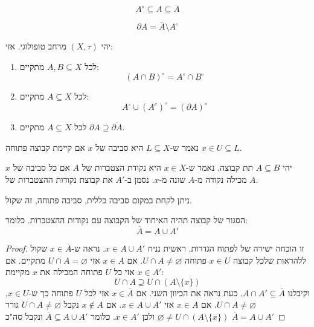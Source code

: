 \documentclass{tstextbook}
\begin{document}
\begin{proposition}
$$A^{\circ }\subseteq A\subseteq \overline{A} $$

\end{proposition}
\begin{definition}
$$\partial A=\overline{A} \setminus  A^{\circ }$$

\end{definition}
\begin{proposition}
יהי \((X,\tau)\) מרחב טופולוגי. אזי:

  \begin{enumerate}
    \item לכל \(A,B \subseteq X\) מתקיים: 
$$(A\cap  B)^{\circ }=A^{\circ }\cap  B^{\circ }$$


    \item לכל \(A\subseteq X\) מתקיים: 
$$A^{\circ }\cup  (A^{c})^{\circ }=(\partial A)^{\circ }$$


    \item לכל \(A\subseteq X\) מתקיים \(\partial A \supseteq \overline{\partial A}\). 


  \end{enumerate}
\end{proposition}
\begin{definition}
נאמר ש-\(L\subseteq X\) היא סביבה של \(x\) אם קיימת קבוצה פתוחה \(x \in U \subseteq L\).

\end{definition}
\begin{definition}
יהי \(A \subseteq B\) תת קבוצה. נאמר ש-\(x \in X\) היא נקודת הצטברות של \(A\) אם כל סביבה של \(x\) מכילה נקודה מ-\(A\) שונה מ-\(x\). נסמן ב-\(A'\) את קבוצת נקודות ההצטברות של \(A\).

\end{definition}
\begin{remark}
ניתן לקחת במקום סביבה כללית, סביבה פתוחה, זה שקול.

\end{remark}
\begin{proposition}
הסגור של קבוצה תהיה האיחוד של הקבוצה עם נקודות ההצטברות. כלומר:
$$\overline{A} =A\cup  A'$$

\end{proposition}
\begin{proof}
זו הוכחה ישירה של לפתוח הגדרות.
ראשית נניח \(x \in A\cup A'\). נראה ש-\(x \in \overline{A}\) שקול ללהראות שלכל קבוצה \(x \in U\) פתוחה \(U\cap A\neq \varnothing\).
אם \(x \in A\) אזי \(U\cap A = \varnothing\) מתקיים.
אם \(x \in A'\) אזי כל \(U\) פתוחה המכילה את \(x\) מקיימת:
$$U\cap  A \supseteq U\cap  (A\setminus  \{ x \})$$
וקיבלנו \(A\cap A'\subseteq \overline{A}\).
כעת נראה את הכיוון השני. אם \(x \in \overline{A}\) אזי לכל \(U\) פתוחה כך ש-\(x \in U\), \(U\cap A \neq \varnothing\).
אם \(x \in A\) אזי \(x \in A\cup A'\).
אם \(x \not\in A\) נקבל \(U\cap A \neq \varnothing\) גורר \(\varnothing \neq U \cap (A \setminus \{  x \})\) ולכן \(x \in A'\). כלומר \(\overline{A}\subseteq A\cup A'\) ונקבל סה"כ \(\overline{A}=A\cup A'\)

\end{proof}
\end{document}
